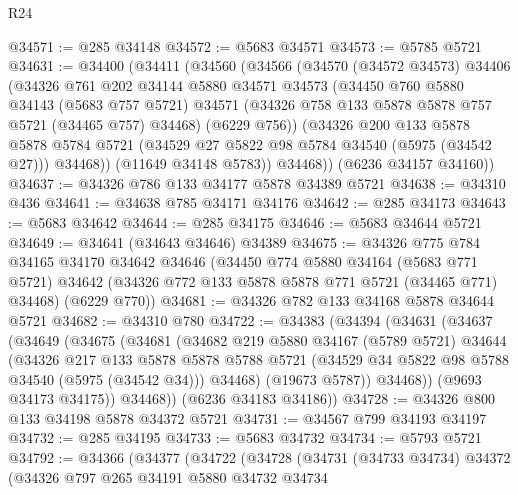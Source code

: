 \begin{lexlean}{R24}
\begin{coremodule}
@34571 := @285 @34148
@34572 := @5683 @34571
@34573 := @5785 @5721
@34631 := @34400
    (@34411
      (@34560
        (@34566
          (@34570
            (@34572 @34573)
            @34406
            (@34326
              @761
              @202
              @34144
              @5880
              @34571
              @34573
              (@34450
                @760
                @5880
                @34143
                (@5683 @757 @5721)
                @34571
                (@34326 @758 @133 @5878 @5878 @757 @5721 (@34465 @757) @34468)
                (@6229 @756))
              (@34326
                @200
                @133
                @5878
                @5878
                @5784
                @5721
                (@34529 @27 @5822 @98 @5784 @34540 (@5975 (@34542 @27)))
                @34468))
            (@11649 @34148 @5783))
          @34468))
      (@6236 @34157 @34160))
@34637 := @34326 @786 @133 @34177 @5878 @34389 @5721
@34638 := @34310 @436
@34641 := @34638 @785 @34171 @34176
@34642 := @285 @34173
@34643 := @5683 @34642
@34644 := @285 @34175
@34646 := @5683 @34644 @5721
@34649 := @34641 (@34643 @34646) @34389
@34675 := @34326
    @775
    @784
    @34165
    @34170
    @34642
    @34646
    (@34450
      @774
      @5880
      @34164
      (@5683 @771 @5721)
      @34642
      (@34326 @772 @133 @5878 @5878 @771 @5721 (@34465 @771) @34468)
      (@6229 @770))
@34681 := @34326 @782 @133 @34168 @5878 @34644 @5721
@34682 := @34310 @780
@34722 := @34383
    (@34394
      (@34631
        (@34637
          (@34649
            (@34675
              (@34681
                (@34682
                  @219
                  @5880
                  @34167
                  (@5789 @5721)
                  @34644
                  (@34326
                    @217
                    @133
                    @5878
                    @5878
                    @5788
                    @5721
                    (@34529 @34 @5822 @98 @5788 @34540 (@5975 (@34542 @34)))
                    @34468)
                  (@19673 @5787))
                @34468))
            (@9693 @34173 @34175))
          @34468))
      (@6236 @34183 @34186))
@34728 := @34326 @800 @133 @34198 @5878 @34372 @5721
@34731 := @34567 @799 @34193 @34197
@34732 := @285 @34195
@34733 := @5683 @34732
@34734 := @5793 @5721
@34792 := @34366
    (@34377
      (@34722
        (@34728
          (@34731
            (@34733 @34734)
            @34372
            (@34326
              @797
              @265
              @34191
              @5880
              @34732
              @34734

\end{coremodule}
\end{lexlean}
